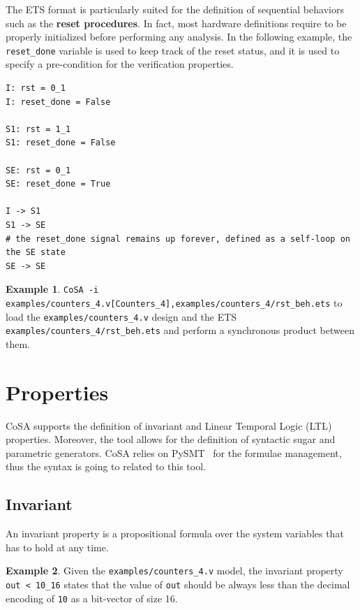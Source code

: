\documentclass{article}
\theoremstyle{definition}
\newtheorem{example}{Example}[section]
\begin{document}
The ETS format is particularly suited for the definition of sequential
behaviors such as the \textbf{reset procedures}. In fact, most
hardware definitions require to be properly initialized before
performing any analysis. In the following example, the
\texttt{reset\_done} variable is used to keep track of the reset
status, and it is used to specify a pre-condition for the verification
properties.

\begin{lstlisting}[frame=single,language=ets,caption=Reset procedure example,label=reset]
I: rst = 0_1
I: reset_done = False

S1: rst = 1_1
S1: reset_done = False

SE: rst = 0_1
SE: reset_done = True

I -> S1
S1 -> SE
# the reset_done signal remains up forever, defined as a self-loop on the SE state
SE -> SE
\end{lstlisting}

\begin{example}
  \texttt{CoSA -i
    examples/counters\_4.v[Counters\_4],examples/counters\_4/rst\_beh.ets}
  to load the \texttt{examples/counters\_4.v} design and the ETS
  \texttt{examples/counters\_4/rst\_beh.ets} and perform a synchronous
  product between them.
\end{example}

\section{Properties}
\label{sec:properties}

CoSA supports the definition of invariant and Linear Temporal Logic
(LTL) properties. Moreover, the tool allows for the definition of
syntactic sugar and parametric generators. CoSA relies on
PySMT~\cite{gario2015pysmt} for the formulae management, thus the
syntax is going to related to this tool.

\subsection{Invariant}
An invariant property is a propositional formula over the system
variables that has to hold at any time. 

\begin{example}
  Given the \texttt{examples/counters\_4.v} model, the invariant property
  \texttt{out < 10\_16} states that the value of \texttt{out} should
  be always less than the decimal encoding of \texttt{10} as a
  bit-vector of size {16}.
\end{example}
\end{document}
